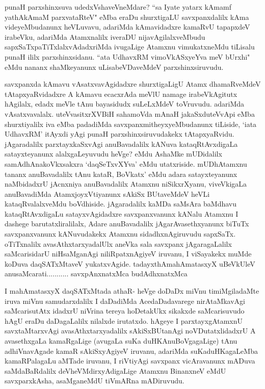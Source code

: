 \begin{artha}
punaH parxshinxsuva udedxVshaveVneMdare? ``sa Iyate yatarx kAmamf yathAkAmaM parxvataRteV" eMba eraDu shurxtigaLU savxpanxdalilx kAma videyeMbudanunx heVLuvavu, adariMda kAmavidadxre kamaRvU tapapxdeV irabeVku, adariMda Atamxnalilx iveraDU nijavAgilalxveMbudu sapxSaTxpaTiTxlalxvAdadxriMda ivugaLige Atamxnu vimukatxneMdu tiLisalu punaH ililx parxshinxsidanu. ``ata UdhavxRM vimoVkASxyeYva meV bUrxhi" eMdu nananx shaMkeyanunx uLisabeVDaveMdeV parxshinxsiruvudu.
\end{artha}

\begin{artha}
savxpanxda kAmavu vAsatxvavAgidadxre shurxtigaLigU Atamx dhamaRveMdeV tAtapxyaRvidadxre A kAmavu ecacxrAda meVlU namage irabeVkAgitutx hAgilalx, edadx meVle tAnu bayasidudx suLeLxMdeV toVruvudu. adariMda vAsatxvavalalx. uteVvasitxrXVBiH sahamoVda mAnaH jakaSxduteVvApi eMba shurxtiyalilx iva eMba padadiMda savxpanxmitheyxyeMbudanunx tiLiside, `iata UdhavxRM' itAyxdi yAgi punaH parxshinxsiruvudakekx tAtapxyaRvidu. jAgaradalilx parxtayxkaSxvAgi anuBavadalilx kANuva kataqRtAvxdigaLa satayxteyanunx alalxgaLeyuvudu heVge? eMdu AshaMke mUDidalilx samAdhAnakoVkxsakxra `daqSeTxvXYva' eMdu utatxriside. mUDhAtamxnu tananx anuBavadalilx tAnu kataR, BoVkatx' eMdu adara satayxteyanunx naMbidadxrU jAcnxniya anuBavadalilx Atamxnu niSikxrXyanu, viveVkigaLa anuBavadiMda AtamxjoyxVtiyanunx sAkiSx BUtaveMdeV heVLi kataqRvalalxveMdu boVdhiside. jAgaradalilx kaMDa saMsAra baMdhavu kataqRtAvxdigaLu satayxvAgidadxre savxpanxvanunx kANalu Atamxnu I dashege barutatxliralilalx, Adare anuBavadalilx jAgarAvasethxyanunx biTuTx savxpanxvanunx kANuvudakekx Atamxnu sidadhxnAgiruvudu sapxSaTx. oTiTxnalilx avasAthxtarxyadalUlx aneVka sala savxpanx jAgaragaLalilx saMcarisidarU niHsaMganAgi niliRpatxnAgiyeV iruvanu, I viSayakekx muMde koDuva daqSATxMtaveV yukatxvAgide. 
tadayxthAmahAmatasxyX uBeVkUleV anusaMcarati........... savxpAnxnatxMca budAdhxnatxMca
\end{artha}%

\begin{artha}
I mahAmatasxyX daqSATxMtada athaR- heVge doDaDx miVnu timiMgiladaMte iruva miVnu samudarxdalilx I daDadiMda AcedaDadavarege nirAtaMkavAgi saMcarisutAtx idadxrU niVrina tereya hoDetakUkx sikakxde saMcarisuvudo hAgU eraDu daDagaLalilx nilalxde irutatxdo. hAgeye I parxtayxgAtamxnU savxtaMtarxvAgi avasAthxtarxyadalilx sAkiSxBUtanAgi noVDutatxlidadxrU A avasethxgaLa kamaRgaLige (avugaLa suKa duHKAnuBoVgagaLige) tAnu adhiVnavAgade kamaR sAkiSxyAgiyeV iruvanu, adariMda suKaduHKagaLeMba kamaRPalagaLu aMTade iruvanu, I riVtiyAgi savxpanx vicAravanunx mADuva saMdaBaRdalilx deVheVMdirxyAdigaLige Atamxnu BinanxneV eMdU savxparxkAsha, asaMganeMdU tiVmARna mADiruvudu. 
\end{artha}%

